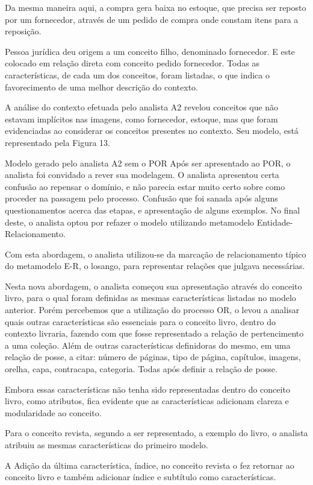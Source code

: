 Da mesma maneira aqui, a compra gera baixa no estoque, que precisa ser reposto por um fornecedor, através de um pedido de compra onde constam itens para a reposição.

Pessoa jurídica deu origem a um conceito filho, denominado fornecedor. E este colocado em relação direta com conceito pedido fornecedor. Todas as características, de cada um dos conceitos, foram listadas, o que indica o favorecimento de uma melhor descrição do contexto.

A análise do contexto efetuada pelo analista A2 revelou conceitos que não estavam implícitos nas imagens, como fornecedor, estoque, mas que foram evidenciadas ao considerar os conceitos presentes no contexto. Seu modelo, está representado pela Figura 13.


Modelo gerado pelo analista A2 sem o POR
Após ser apresentado ao POR, o analista foi convidado a rever sua modelagem. O analista apresentou certa confusão ao repensar o domínio, e não parecia estar muito certo sobre como proceder na passagem pelo processo. Confusão que foi sanada após alguns questionamentos acerca das etapas, e apresentação de alguns exemplos. No final deste, o analista optou por refazer o modelo utilizando metamodelo Entidade-Relacionamento.

Com esta abordagem, o analista utilizou-se da marcação de relacionamento típico do metamodelo E-R, o losango, para representar relações que julgava necessárias.

Nesta nova abordagem, o analista começou sua apresentação através do conceito livro, para o qual foram definidas as mesmas características listadas no modelo anterior. Porém percebemos que a utilização do processo OR, o levou a analisar quais outras características são essenciais para o conceito livro, dentro do contexto livraria, fazendo com que fosse representado a relação de pertencimento a uma coleção. Além de outras características definidoras do mesmo, em uma relação de posse, a citar: número de páginas, tipo de página, capítulos, imagens, orelha, capa, contracapa, categoria. Todas após definir a relação de posse.

Embora essas características não tenha sido representadas dentro do conceito livro, como atributos, fica evidente que as características adicionam clareza e modularidade ao conceito.

Para o conceito revista, segundo a ser representado, a exemplo do livro, o analista atribuiu as mesmas características do primeiro modelo.

A Adição da última característica, índice, no conceito revista o fez retornar ao conceito livro e também adicionar índice e subtítulo como características.

